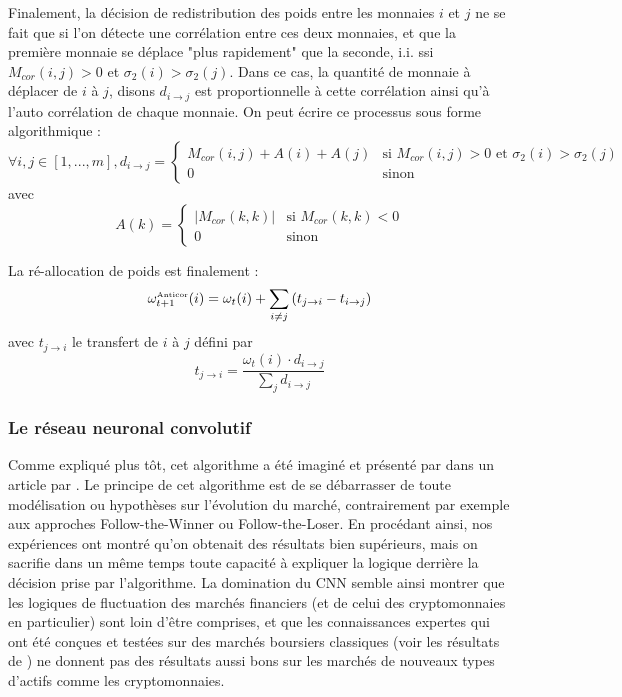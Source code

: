 \documentclass[a4paper, 10pt]{article}
\begin{document}
Finalement, la décision de redistribution des poids entre les monnaies $i$ et $j$ ne se fait que si l'on détecte une corrélation entre ces deux monnaies, et que la première monnaie se déplace "plus rapidement" que la seconde, i.i. ssi $M_{cor}(i,j) > 0$ et $\sigma_2(i) > \sigma_2(j)$. Dans ce cas, la quantité de monnaie à déplacer de $i$ à $j$, disons $d_{i\rightarrow j}$ est proportionnelle à cette corrélation ainsi qu'à l'auto corrélation de chaque monnaie. On peut écrire ce processus sous forme algorithmique :
\begin{equation}
    \forall i, j \in [1, ..., m], d_{i\rightarrow j} =
        \begin{cases}
            M_{cor}(i,j) + A(i) + A(j) & \text{si } M_{cor}(i,j) > 0 \text{ et } \sigma_2(i) > \sigma_2(j) \\
            0                          & \text{sinon}
        \end{cases}
\end{equation}
avec
\begin{equation}
    A(k) = 
    \begin{cases}
        |M_{cor}(k,k)| & \text{si } M_{cor}(k,k) < 0 \\
        0              & \text{sinon}
    \end{cases}
\end{equation}

La ré-allocation de poids est finalement :
\begin{equation}
    \omega_{t+1}^{\text{\tiny Anticor}}(i) = \omega_{t}(i) + \sum_{i \ne j} \left(t_{j\rightarrow i} - t_{i\rightarrow j} \right)
\end{equation}
avec $t_{j\rightarrow i}$ le transfert de $i$ à $j$ défini par
\begin{equation}
    t_{j\rightarrow i} = \frac{\omega_{t}(i) \cdot d_{i\rightarrow j}}{\sum_{j} d_{i\rightarrow j}}
\end{equation}

\subsubsection{Le réseau neuronal convolutif}

Comme expliqué plus tôt, cet algorithme a été imaginé et présenté par dans un article par \citet{Jiang2017}. Le principe de cet algorithme est de se débarrasser de toute modélisation ou hypothèses sur l'évolution du marché, contrairement par exemple aux approches Follow-the-Winner ou Follow-the-Loser. En procédant ainsi, nos expériences ont montré qu'on obtenait des résultats bien supérieurs, mais on sacrifie dans un même temps toute capacité à expliquer la logique derrière la décision prise par l'algorithme. La domination du CNN semble ainsi montrer que les logiques de fluctuation des marchés financiers (et de celui des cryptomonnaies en particulier) sont loin d'être comprises, et que les connaissances expertes qui ont été conçues et testées sur des marchés boursiers classiques (voir les résultats de \cite{Li2014}) ne donnent pas des résultats aussi bons sur les marchés de nouveaux types d'actifs comme les cryptomonnaies.
\end{document}
